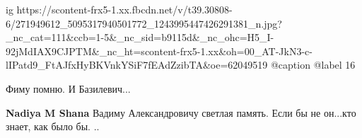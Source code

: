  
 
 
 
 

\ifcmt
  ig https://scontent-frx5-1.xx.fbcdn.net/v/t39.30808-6/271949612_5095317940501772_1243995447426291381_n.jpg?_nc_cat=111&ccb=1-5&_nc_sid=b9115d&_nc_ohc=H5_I-92jMdIAX9CJPTM&_nc_ht=scontent-frx5-1.xx&oh=00_AT-JkN3-c-lIPatd9_FtAJfxHyBKVnkYSiF7fEAdZzibTA&oe=62049519
  @caption @label 16
\fi

Фиму помню. И Базилевич...

\textbf{Nadiya M Shana} Вадиму Александровичу светлая память. Если бы не он...кто знает, как было бы. ..
